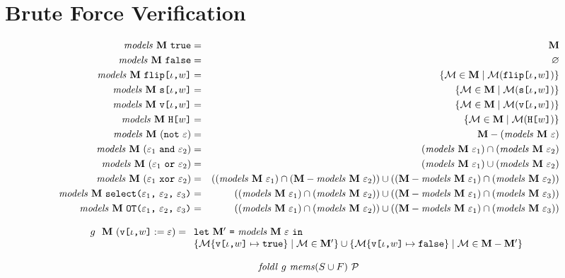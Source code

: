 \section{Brute Force Verification}
\label{section-bruteforce}

\begin{eqnarray*}
\solve{\stores}{\etrue} &=& \stores\\
\solve{\stores}{\efalse} &=& \varnothing\\
\solve{\stores}{\flip{\cid}{w}} &=& \{ \store \in \stores \mid \store(\flip{\cid}{w}) \} \\
\solve{\stores}{\secret{\cid}{w}} &=& \{ \store \in \stores \mid \store(\secret{\cid}{w}) \} \\
\solve{\stores}{\view{\cid}{w}} &=& \{ \store \in \stores \mid \store(\view{\cid}{w}) \} \\
\solve{\stores}{\oracle{w}} &=& \{ \store \in \stores \mid \store(\oracle{w}) \} \\
\solve{\stores}{(\enot\ \be)} &=& \stores - (\solve{\stores}{\be})\\
\solve{\stores}{(\be_1\ \eand\ \be_2)} &=& (\solve{\stores}{\be_1}) \cap (\solve{\stores}{\be_2}) \\
\solve{\stores}{(\be_1\ \eor\ \be_2)} &=& (\solve{\stores}{\be_1}) \cup (\solve{\stores}{\be_2}) \\
\solve{\stores}{(\be_1\ \exor\ \be_2)} &=&
 ((\solve{\stores}{\be_1}) \cap (\stores - \solve{\stores}{\be_2})) \cup
 ((\stores - \solve{\stores}{\be_1}) \cap (\solve{\stores}{\be_2})) \\
\solve{\stores}{\select{\be_1}{\be_2}{\be_3}} &=&
 ((\solve{\stores}{\be_1}) \cap (\solve{\stores}{\be_2})) \cup
 ((\stores - \solve{\stores}{\be_1}) \cap (\solve{\stores}{\be_3})) \\
\solve{\stores}{\OT{\be_1}{\be_2}{\be_3}} &=&
 ((\solve{\stores}{\be_1}) \cap (\solve{\stores}{\be_2})) \cup
 ((\stores - \solve{\stores}{\be_1}) \cap (\solve{\stores}{\be_3}))
\end{eqnarray*}

$$
g\ \ \stores\ (\eassign{\view{\cid}{w}}{\be}) =\begin{array}[t]{l}
\elet{\stores'}{\solve{\stores}{\be}}{}\\
  \{\extend{\store}{\view{\cid}{w}}{\etrue} \mid \store \in \stores' \} \cup
  \{\extend{\store}{\view{\cid}{w}}{\efalse} \mid \store \in \stores - \stores' \}\end{array}
$$

$$
\mathit{foldl}\ g\ \mems(S \cup F)\ \prog
$$

